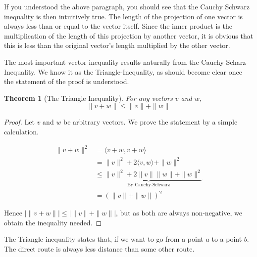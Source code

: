 \documentclass{report}
\newtheorem{theorem}{Theorem}[chapter]
\begin{document}
If you understood the above paragraph, you should see that the Cauchy Schwarz inequality is then intuitively true. The length of the projection of one vector is always less than or equal to the vector itself. Since the inner product is the multiplication of the length of this projection by another vector, it is obvious that this is less than the original vector's length multiplied by the other vector.

The most important vector inequality results naturally from the Cauchy-Scharz-Inequality. We know it as the Triangle-Inequality, as should become clear once the statement of the proof is understood.

\begin{theorem}[The Triangle Inequality]
  For any vectors $v$ and $w$,
  \[ \| v + w \| \leq \| v \| + \| w \| \]
\end{theorem}

\begin{proof}
  Let $v$ and $w$ be arbitrary vectors. We prove the statement by a simple calculation.

  \begin{align*}
    \| v + w \|^2 &= \langle v + w, v + w \rangle\\
                  &= \|v\|^2 + 2\langle v,w \rangle + \|w\|^2\\
                  &\underbrace{\leq \|v\|^2 + 2\|v\|\|w\| + \|w\|^2}_\text{By Cauchy-Schwarz}\\
                  &= (\|v\| + \|w\|)^2
  \end{align*}

  Hence $| \| v + w \| | \leq |\|v\| + \|w\| |$, but as both are always non-negative, we obtain the inequality needed.
\end{proof}

\begin{center}
\end{center}

The Triangle inequality states that, if we want to go from a point $a$ to a point $b$. The direct route is always less distance than some other route.
\end{document}
